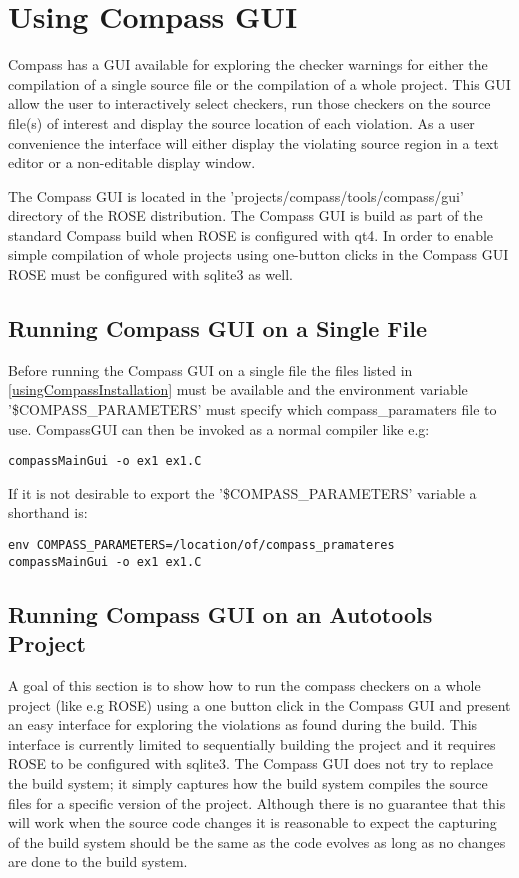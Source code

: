 \chapter{Using Compass GUI}

Compass has a GUI available for exploring the checker warnings for either the compilation
of a single source file or the compilation of a whole project. This GUI allow the user to
interactively select checkers, run those checkers on the source file(s) of 
interest and display the source location of each violation. As a user convenience the
interface will either display the violating source region in a text editor or a 
non-editable display window.

The Compass GUI is located in the 'projects/compass/tools/compass/gui' directory of the
ROSE distribution. The Compass GUI is build as part of the standard Compass build when
ROSE is configured with qt4. In order to enable simple compilation of whole projects using
one-button clicks in the Compass GUI ROSE must be configured with sqlite3 as well.

\section{Running Compass GUI on a Single File}
\label{runningCompassGUISingleFile}

Before running the Compass GUI on a single file  the files listed 
in \ref{usingCompassInstallation} must be available and the environment variable 
'\$COMPASS\_PARAMETERS' must specify which compass\_paramaters file to use. CompassGUI can
then be invoked as a normal compiler like e.g:
\begin{verbatim}
compassMainGui -o ex1 ex1.C
\end{verbatim}
If it is not desirable to export the '\$COMPASS\_PARAMETERS' variable a shorthand is:
\begin{verbatim}
env COMPASS_PARAMETERS=/location/of/compass_pramateres   compassMainGui -o ex1 ex1.C
\end{verbatim}

\section{Running Compass GUI on an Autotools Project}

A goal of this section is to show how to run the compass checkers on a whole project (like e.g ROSE) 
using a one button click in the Compass GUI and present an easy interface for exploring the violations
as found during the build. This interface is currently limited to sequentially building the
project and it requires ROSE to be configured with sqlite3. The Compass GUI does not try to replace the 
build system; it simply captures how the build system compiles the source files for a specific version of the 
project. Although there is no guarantee that this will work when the source code changes it is reasonable to 
expect the capturing of the build system should be the same as the code evolves as long as no changes are done 
to the build system.

